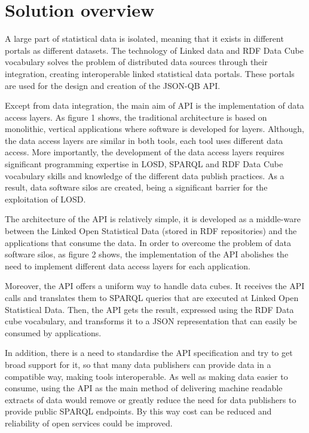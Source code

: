\documentclass{llncs}
\begin{document}
\section{Solution overview}\label{sec:overview}

A large part of statistical data is isolated, meaning that it exists in different portals as different datasets. The technology of Linked data and RDF Data Cube vocabulary solves the problem of distributed data sources through their integration, creating interoperable linked statistical data portals. These portals are used for the design and creation of the JSON-QB API. 
 
Except from data integration, the main aim of API is the implementation of data access layers. As figure 1 shows, the traditional architecture is based on monolithic, vertical applications where software is developed for layers. Although, the data access layers are similar in both tools, each tool uses different data access. More importantly, the development of the data access layers requires significant programming expertise in LOSD, SPARQL and RDF Data Cube vocabulary skills and knowledge of the different data publish practices. As a result, data software silos are created, being a significant barrier for the exploitation of LOSD. 

The architecture of the API is relatively simple, it is developed as a middle-ware between the Linked Open Statistical Data (stored in RDF repositories) and the applications that consume the data. In order to overcome the problem of data software silos, as figure 2 shows, the implementation of the API abolishes the need to implement different data access layers for each application.

Moreover, the API offers a uniform way to handle data cubes. It receives the API calls and translates them to SPARQL queries that are executed at Linked Open Statistical Data. Then, the API gets the result, expressed using the RDF Data cube vocabulary, and transforms it to a JSON representation that can easily be consumed by applications. 
 
In addition, there is a need to standardise the API specification and try to get broad support for it, so that many data publishers can provide data in a compatible way, making tools interoperable. As well as making data easier to consume, using the API as the main method of delivering machine readable extracts of data would remove or greatly reduce the need for data publishers to provide public SPARQL endpoints. By this way cost can be reduced and reliability of open services could be improved.
\end{document}
